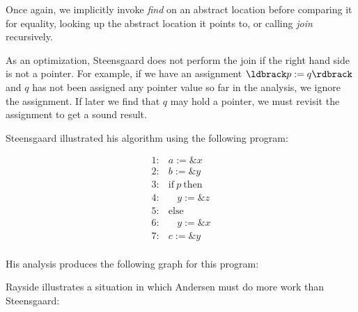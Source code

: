 \documentclass[11pt]{article}
\begin{document}
Once again, we implicitly invoke \textit{find} on an abstract location before comparing it for equality, looking up the abstract location it points to, or calling \textit{join} recursively.

As an optimization, Steensgaard does not perform the join if the right hand side is not a pointer.  For example, if we have an assignment $\parg{p := q}$ and $q$ has not been assigned any pointer value so far in the analysis, we ignore the assignment.  If later we find that $q$ may hold a pointer, we must revisit the assignment to get a sound result.

Steensgaard illustrated his algorithm using the following program:

\[
\begin{array}{ll}
1: & a := \&x\\
2: & b := \&y\\
3: & \mbox{if}~ p ~\mbox{then}\\
4: & ~~~~ y := \&z\\
5: & \mbox{else}\\
6: & ~~~~ y := \&x\\
7: & c := \&y\\
\end{array}
\]

His analysis produces the following graph for this program:






Rayside illustrates a situation in which Andersen must do more work than Steensgaard:

\end{document}
